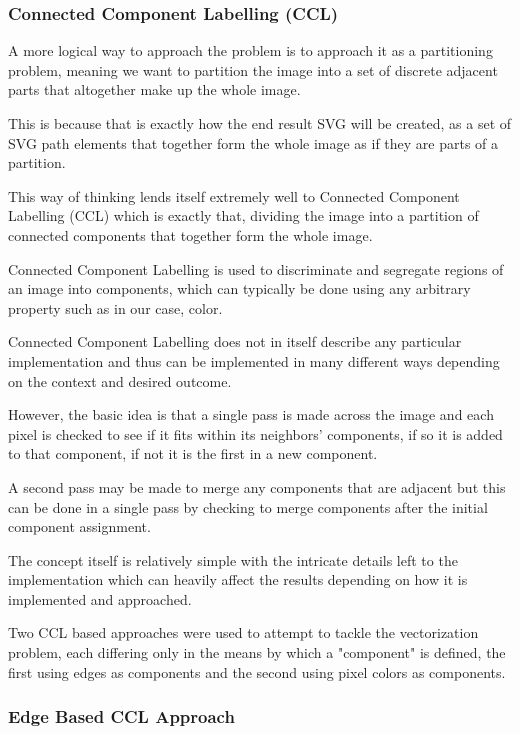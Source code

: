 \documentclass[12pt]{article}
\newcommand{\sentence}{} %
\begin{document}
    \subsubsection{Connected Component Labelling (CCL)}\label{subsubsec:connected-component-labelling-(ccl)}

    \tab
    A more logical way to approach the problem is to approach it as a partitioning problem, meaning we want to
    partition the image into a set of discrete adjacent parts that altogether make up the whole image.
    \sentence
    This is because that is exactly how the end result SVG will be created, as a set of SVG path elements that together
    form the whole image as if they are parts of a partition.
    \sentence
    This way of thinking lends itself extremely well to Connected Component Labelling (CCL) which is exactly that,
    dividing the image into a partition of connected components that together form the whole image\cite{dillencourt1992general}.
    \sentence
    Connected Component Labelling is used to discriminate and segregate regions of an image into components, which
    can typically be done using any arbitrary property such as in our case, color.
    \sentence
    Connected Component Labelling does not in itself describe any particular implementation and thus can be
    implemented in many different ways depending on the context and desired outcome\cite{dillencourt1992general}.
    \sentence
    However, the basic idea is that a single pass is made across the image and each pixel is checked to see if it
    fits within its neighbors' components, if so it is added to that component, if not it is the first in a new
    component\cite{dillencourt1992general}.
    \sentence
    A second pass may be made to merge any components that are adjacent but this can be done in a single pass
    by checking to merge components after the initial component assignment.
    \sentence
    The concept itself is relatively simple with the intricate details left to the implementation which can heavily
    affect the results depending on how it is implemented and approached.
    \sentence
    Two CCL based approaches were used to attempt to tackle the vectorization problem, each differing only in the
    means by which a "component" is defined, the first using edges as components and the second using pixel colors as
    components.

    \subsubsection{Edge Based CCL Approach}\label{subsubsec:edge-based-ccl-approach}
\end{document}

